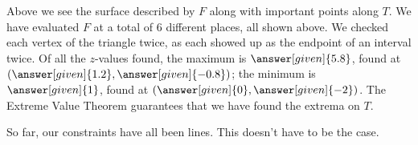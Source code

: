 \documentclass{ximera}
\begin{document}
\begin{example}
\begin{explanation}
\begin{image}
    \end{image}
    Above we see the surface described by $F$ along with important
    points along $T$.  We have evaluated $F$ at a total of $6$
    different places, all shown above. We checked each vertex of the
    triangle twice, as each showed up as the endpoint of an interval
    twice. Of all the $z$-values found, the maximum is
    $\answer[given]{5.8}$, found at
    $\left(\answer[given]{1.2},\answer[given]{-0.8}\right)$; the
    minimum is $\answer[given]{1}$, found at
    $\left(\answer[given]{0},\answer[given]{-2}\right)$. The Extreme Value Theorem guarantees that we have found the extrema on $T$.
  \end{explanation}
\end{example}

So far, our constraints have all been lines. This doesn't have to be the case. 
\end{document}
